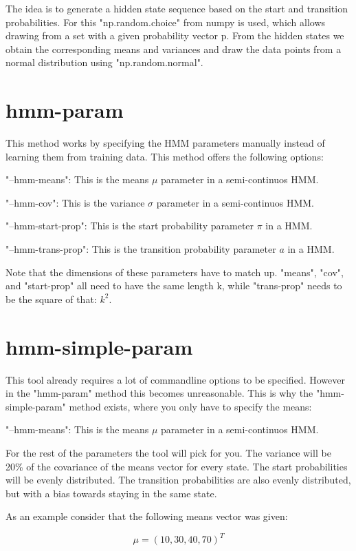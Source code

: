 The idea is to generate a hidden state sequence based on the start and transition probabilities. For this "np.random.choice" from numpy is used, which allows drawing from a set with a given probability vector p. From the hidden states we obtain the corresponding means and variances and draw the data points from a normal distribution using "np.random.normal". 

\section{hmm-param}

This method works by specifying the HMM parameters manually instead of learning them from training data. This method offers the following options: 

"--hmm-means": This is the means $\mu$ parameter in a semi-continuos HMM. 

"--hmm-cov": This is the variance $\sigma$ parameter in a semi-continuos HMM. 

"--hmm-start-prop": This is the start probability parameter $\pi$ in a HMM. 

"--hmm-trans-prop": This is the transition probability parameter $a$ in a HMM. 

Note that the dimensions of these parameters have to match up. "means", "cov", and "start-prop" all need to have the same length k, while "trans-prop" needs to be the square of that: $k^2$. 

\section{hmm-simple-param}

This tool already requires a lot of commandline options to be specified. However in the "hmm-param" method this becomes unreasonable. This is why the "hmm-simple-param" method exists, where you only have to specify the means: 

"--hmm-means": This is the means $\mu$ parameter in a semi-continuos HMM. 

For the rest of the parameters the tool will pick for you. The variance will be 20\% of the covariance of the means vector for every state. The start probabilities will be evenly distributed. The transition probabilities are also evenly distributed, but with a bias towards staying in the same state. 

As an example consider that the following means vector was given: 

\begin{equation}
    \mu = (10, 30, 40, 70)^T
\end{equation}

